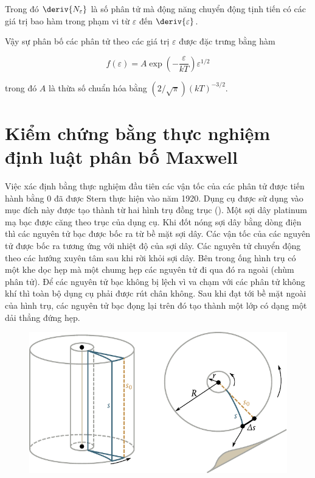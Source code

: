 \noindent
Trong đó $\deriv{N_{\varepsilon}}$ là số phân tử mà động năng chuyển động tịnh tiến có các giá trị bao hàm trong phạm vi từ $\varepsilon$ đến $\deriv{\varepsilon}$.

Vậy sự phân bố các phân tử theo các giá trị $\varepsilon$ được đặc trưng bằng hàm

\begin{equation}\label{eq:11_73}
	f(\varepsilon) = A  \exp\left(-\frac{\varepsilon}{kT}\right) \varepsilon^{1/2}
\end{equation}

\noindent
trong đó $A$ là thừa số chuẩn hóa bằng $(2/\sqrt{\pi}) (kT)^{-3/2}$.

\section{Kiểm chứng bằng thực nghiệm định luật phân bố Maxwell}\label{sec:11_7}

Việc xác định bằng thực nghiệm đầu tiên các vận tốc của các phân tử được tiến hành bằng 0 đã được Stern thực hiện vào năm 1920. Dụng cụ được sử dụng vào mục đích này được tạo thành từ hai hình trụ đồng trục (). Một sợi dây platinum mạ bạc được căng theo trục của dụng cụ. Khi đốt nóng sợi dây bằng dòng điện thì các nguyên tử bạc được bốc ra từ bề mặt sợi dây. Các vận tốc của các nguyên tử được bốc ra tương ứng với nhiệt độ của sợi dây. Các nguyên tử chuyển động theo các hướng xuyên tâm sau khi rời khỏi sợi dây. Bên trong ống hình trụ có một khe dọc hẹp mà một chumg hẹp các nguyên tử đi qua đó ra ngoài (chùm phân tử). Để các nguyên tử bạc không bị lệch vì va chạm với các phân tử không khí thì toàn bộ dụng cụ phải được rút chân không. Sau khi đạt tới bề mặt ngoài của hình trụ, các nguyên tử bạc đọng lại trên đó tạo thành một lớp có dạng một dải thẳng đứng hẹp. 

\begin{figure}[!htb]
	\begin{center}
		\includegraphics[scale=1.0]{figures/ch_11/fig_11_20.pdf}
		\caption[]{}
		\label{fig:11_20}
	\end{center}
	\vspace{-0.6cm}
\end{figure}

